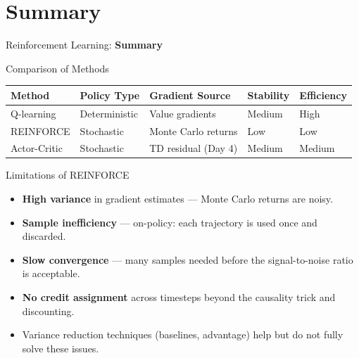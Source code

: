 \section{Summary}
\begin{frame}{}
    \LARGE Reinforcement Learning: \textbf{Summary}
\end{frame}

\begin{frame}{Comparison of Methods}
    \begin{table}[]
        \centering
        \renewcommand{\arraystretch}{1.8}
        \begin{tabular}{lllll}
            \hline
            \textbf{Method} & \textbf{Policy Type} & \textbf{Gradient Source} & \textbf{Stability} & \textbf{Efficiency} \\
            \hline
            Q-learning    & Deterministic & Value gradients         & Medium & High \\
            REINFORCE     & Stochastic    & Monte Carlo returns     & Low    & Low  \\
            Actor-Critic  & Stochastic    & TD residual (Day 4)     & Medium & Medium \\
            \hline
        \end{tabular}
    \end{table}
\end{frame}

\begin{frame}{Limitations of REINFORCE}
    \begin{itemize}
        \item \textbf{High variance} in gradient estimates --- Monte Carlo returns are noisy.
        \item \textbf{Sample inefficiency} --- on-policy: each trajectory is used once and discarded.
        \item \textbf{Slow convergence} --- many samples needed before the signal-to-noise ratio is acceptable.
        \item \textbf{No credit assignment} across timesteps beyond the causality trick and discounting.
        \item Variance reduction techniques (baselines, advantage) help but do not fully solve these issues.
    \end{itemize}
\end{frame}

